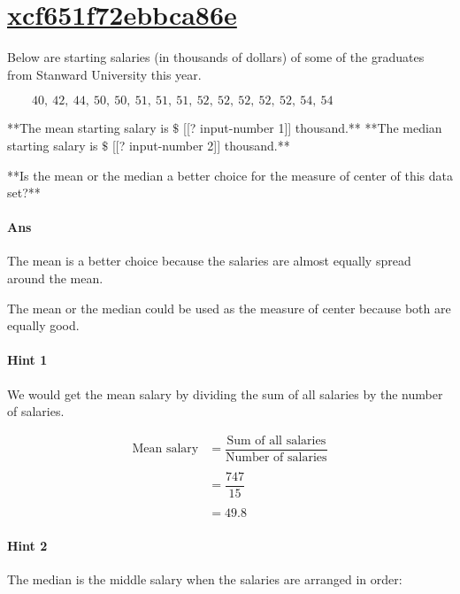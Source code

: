 \documentclass[twocolumn,10pt]{article}
\begin{document}
\section{\href{https://www.khanacademy.org/devadmin/content/items/xcf651f72ebbca86e}{xcf651f72ebbca86e}}

\noindent
Below are starting salaries (in thousands of dollars) of some of the graduates from Stanward University this year.

$\qquad40,~42,~44,~50,~50,~51,~51,~51,~52,~52,~52,~52,~52,~54,~54$

**The mean starting salary is $\$$ [[? input-number 1]] thousand.**  
**The median starting salary is $\$$ [[? input-number 2]] thousand.**

**Is the mean or the median a better choice for the measure of center of this data set?**

\paragraph{Ans} 

The mean is a better choice because the salaries are almost equally spread around the mean.


 The mean or the median could be used as the measure of center because both are equally good.




\paragraph{Hint 1}We would get the mean salary by dividing the sum of all salaries by the number of salaries.

\begin{align*}\text{Mean salary}&=\dfrac{\text{Sum of all salaries}}{\text{Number of salaries}}\\
\\
&=\dfrac{747}{15}\\
\\
&= 49.8\end{align*}

\paragraph{Hint 2}The median is the middle salary when the salaries are arranged in order:
\end{document}
